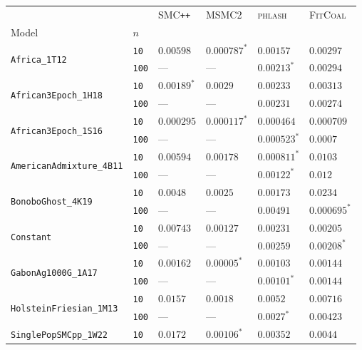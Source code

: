 \documentclass{article}
\begin{document}
\begin{footnotesize}
\begin{tabular}{llllll}
\toprule
 &  & \textsc{SMC}\texttt{{++}} & \textsc{MSMC2} & \textsc{phlash} & \textsc{FitCoal} \\
Model & $n$ &  &  &  &  \\
\midrule
\multirow[c]{2}{*}{\texttt{Africa\_1T12}} & \texttt{10} & $0.00598$ & $\mathbf{0.000787}^*$ & $0.00157$ & $0.00297$ \\
 & \texttt{100} & --- & --- & $\mathbf{0.00213}^*$ & $0.00294$ \\
\cline{1-6}
\multirow[c]{2}{*}{\texttt{African3Epoch\_1H18}} & \texttt{10} & $\mathbf{0.00189}^*$ & $0.0029$ & $0.00233$ & $0.00313$ \\
 & \texttt{100} & --- & --- & $\mathbf{0.00231}$ & $0.00274$ \\
\cline{1-6}
\multirow[c]{2}{*}{\texttt{African3Epoch\_1S16}} & \texttt{10} & $0.000295$ & $\mathbf{0.000117}^*$ & $0.000464$ & $0.000709$ \\
 & \texttt{100} & --- & --- & $\mathbf{0.000523}^*$ & $0.0007$ \\
\cline{1-6}
\multirow[c]{2}{*}{\texttt{AmericanAdmixture\_4B11}} & \texttt{10} & $0.00594$ & $0.00178$ & $\mathbf{0.000811}^*$ & $0.0103$ \\
 & \texttt{100} & --- & --- & $\mathbf{0.00122}^*$ & $0.012$ \\
\cline{1-6}
\multirow[c]{2}{*}{\texttt{BonoboGhost\_4K19}} & \texttt{10} & $0.0048$ & $0.0025$ & $\mathbf{0.00173}$ & $0.0234$ \\
 & \texttt{100} & --- & --- & $0.00491$ & $\mathbf{0.000695}^*$ \\
\cline{1-6}
\multirow[c]{2}{*}{\texttt{Constant}} & \texttt{10} & $0.00743$ & $\mathbf{0.00127}$ & $0.00231$ & $0.00205$ \\
 & \texttt{100} & --- & --- & $0.00259$ & $\mathbf{0.00208}^*$ \\
\cline{1-6}
\multirow[c]{2}{*}{\texttt{GabonAg1000G\_1A17}} & \texttt{10} & $0.00162$ & $\mathbf{0.00005}^*$ & $0.00103$ & $0.00144$ \\
 & \texttt{100} & --- & --- & $\mathbf{0.00101}^*$ & $0.00144$ \\
\cline{1-6}
\multirow[c]{2}{*}{\texttt{HolsteinFriesian\_1M13}} & \texttt{10} & $0.0157$ & $\mathbf{0.0018}$ & $0.0052$ & $0.00716$ \\
 & \texttt{100} & --- & --- & $\mathbf{0.0027}^*$ & $0.00423$ \\
\cline{1-6}
\multirow[c]{2}{*}{\texttt{SinglePopSMCpp\_1W22}} & \texttt{10} & $0.0172$ & $\mathbf{0.00106}^*$ & $0.00352$ & $0.0044$ \\

\end{tabular}
\end{footnotesize}
\end{document}
